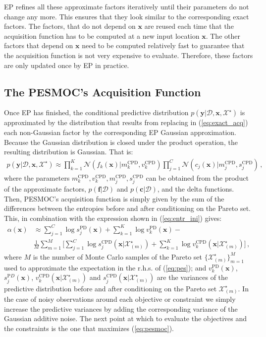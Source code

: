 \documentclass[review,preprint,12pt]{elsarticle}
\begin{document}
EP refines all these approximate factors iteratively until their parameters do not change any more.
This ensures that they look similar to the corresponding exact factors. The factors, that do not 
depend on $\textbf{x}$ are reused each time that the acquisition function has to be computed at 
a new input location $\mathbf{x}$. The other factors that depend on $\textbf{x}$ need to be computed 
relatively fast to guarantee that the acquisition function is not very expensive to evaluate. Therefore, 
these factors are only updated once by EP in practice. 

\subsection{The PESMOC's Acquisition Function}

Once EP has finished, the conditional predictive distribution 
$p(\textbf{y}|\mathcal{D},\textbf{x},\mathcal{X}^{\star})$  is approximated by the 
distribution that results from replacing in (\ref{eq:exact_acq}) 
each non-Gaussian factor by the corresponding EP Gaussian approximation. Because the Gaussian
distribution is closed under the product operation, the resulting distribution is Gaussian. That is:
\begin{align}
p(\textbf{y}|\mathcal{D},\textbf{x},\mathcal{X}^{\star}) \approx 
	\prod_{k=1}^{K} \mathcal{N}(f_k(\mathbf{x})|m_k^\text{CPD},v_k^\text{CPD}) 
	\prod_{j=1}^{C} \mathcal{N}(c_j(\mathbf{x})|m_j^\text{CPD},s_j^\text{CPD})\,,
\end{align}
where the parameters $m_k^\text{CPD},v_k^\text{CPD},m_j^\text{CPD},s_j^\text{CPD}$ can be obtained from 
the product of the approximate factors, $p(\mathbf{f}|\mathcal{D})$ and $p(\mathbf{c}|\mathcal{D})$, and 
the delta functions. Then, PESMOC's acquisition function is simply given by the sum of the
differences between the entropies before and after conditioning
on the Pareto set. This, in combination with the expression
shown in (\ref{eq:entr_ini}) gives:
\begin{align}
\alpha(\textbf{x})  & \approx  \sum_{j=1}^{C}\log s_j^{\text{PD}}(\textbf{x}) + \sum_{k=1}^{K}\log v_k^{\text{PD}}(\textbf{x})
		- \nonumber \\ & \frac{1}{M}\sum_{m=1}^{M} \Big[ \sum_{j=1}^{C}\log s_j^{\text{CPD}}(\textbf{x}|\mathcal{X}^{\star}_{(m)}) + 
		\sum_{k=1}^{K}\log v_k^{\text{CPD}} (\textbf{x}|\mathcal{X}^{\star}_{(m)}) \Big]
\,, \label{eq:pesmoc}
\end{align}
where $M$ is the number of Monte Carlo samples of the Pareto set $\{\mathcal{X}^\star_{(m)}\}_{m=1}^M$ 
used to approximate the expectation in the r.h.s. of (\ref{eq:pes}); 
and ${v}_k^{\text{PD}}(\textbf{x})$, ${s}_j^{\text{P}D}(\textbf{x})$, 
${v}_k^{\text{CPD}}(\textbf{x}|\mathcal{X}^{\star}_{(m)})$ and ${s}_j^{\text{CPD}}(\textbf{x}|\mathcal{X}^{\star}_{(m)})$ 
are the variances of the predictive distribution before and after conditioning on the Pareto 
set $\mathcal{X}^{\star}_{(m)}$. In the case of noisy observations around each 
objective or constraint we simply increase the predictive variances by adding the corresponding variance 
of the Gaussian additive noise. The next point at which to evaluate the objectives and the constraints 
is the one that maximizes (\ref{eq:pesmoc}).
\end{document}
